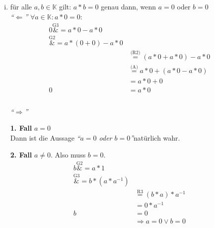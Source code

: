 \documentclass{article}
\begin{document}
\begin{enumerate}[(i)]
\item für alle $a, b \in \mathbb{K}$ gilt: $a * b = 0$ genau dann, wenn $a = 0$ oder $b = 0$ \\
  \emph{``$\Leftarrow$''} $\forall a \in \mathbb{K} \colon a * 0 = 0$:
  \begin{align*}
    0 \overset{\text{G3}}&{=} a * 0 - a * 0 \\
      \overset{\text{G2}}&{=} a * (0 + 0) - a * 0 \\
      &\overset{\text{(R2)}}= (a * 0 + a * 0) - a * 0 \\
      &\overset{\text{(A)}}= a * 0 + (a * 0 - a * 0) \\
      &= a * 0 + 0 \\
    0 &= a * 0 \\
  \end{align*} \\
  \emph{``$\Rightarrow$''} \\
  \begin{minipage}[t]{.4\textwidth}
    \textbf{1. Fall} $a = 0$ \\
    Dann ist die Aussage \emph{``$a = 0$ oder $b = 0$''}natürlich wahr.
  \end{minipage}
  \hfill
  \vrule
  \hfill
  \begin{minipage}[t]{.4\textwidth}
    \textbf{2. Fall} $a \ne 0$. Also muss $b = 0$.
    \begin{align*}
      b \overset{\text{G2}}&= a * 1 \\
        \overset{\text{G3}}&= b * (a * a^{-1}) \\
        &\overset{\text{R3}}= (b * a) * a^{-1} \\
        &= 0 * a^{-1} \\
      b &= 0 \\
        &\Rightarrow a = 0 \lor b = 0
    \end{align*}
  \end{minipage}


\end{enumerate}
\end{document}
